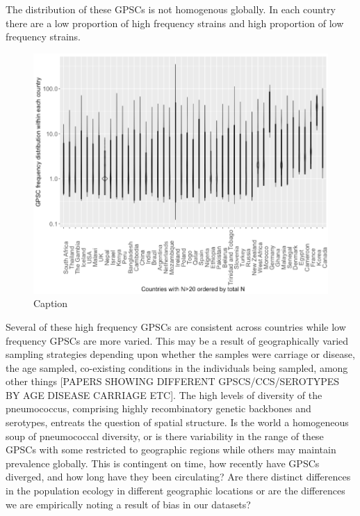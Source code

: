 \documentclass{article}
\begin{document}
The distribution of these GPSCs is not homogenous globally. In each country there are a low proportion of high frequency strains and high proportion of low frequency strains. \begin{figure}
    \centering
    \includegraphics[width=\textwidth]{08MAR21_gpscfreqDistribution.png}
    \caption{Caption}
    \label{fig:gpscfreqdist}
\end{figure} 
Several of these high frequency GPSCs are consistent across countries while low frequency GPSCs are more varied. This may be a result of geographically varied sampling strategies depending upon whether the samples were carriage or disease, the age sampled, co-existing conditions in the individuals being sampled, among other things [PAPERS SHOWING DIFFERENT GPSCS/CCS/SEROTYPES BY AGE DISEASE CARRIAGE ETC]. 
The high levels of diversity of the pneumococcus, comprising highly recombinatory genetic backbones and serotypes, entreats the question of spatial structure. Is the world a homogeneous soup of pneumococcal diversity, or is there variability in the range of these GPSCs with some restricted to geographic regions while others may maintain prevalence globally.  This is contingent on time, how recently have GPSCs diverged, and how long have they been circulating? Are there distinct differences in the population ecology in different geographic locations or are the differences we are empirically noting a result of bias in our datasets? 
\end{document}
